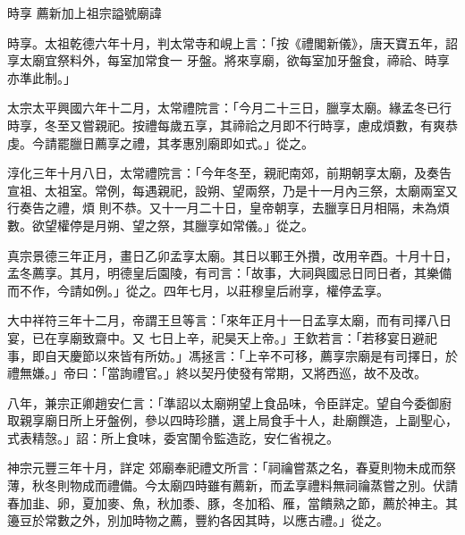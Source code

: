 
\begin{pinyinscope}

 時享
 薦新加上祖宗謚號廟諱



 時享。太祖乾德六年十月，判太常寺和峴上言：「按《禮閣新儀》，唐天寶五年，詔享太廟宜祭料外，每室加常食一
 牙盤。將來享廟，欲每室加牙盤食，禘祫、時享亦準此制。」



 太宗太平興國六年十二月，太常禮院言：「今月二十三日，臘享太廟。緣孟冬已行時享，冬至又嘗親祀。按禮每歲五享，其禘祫之月即不行時享，慮成煩數，有爽恭虔。今請罷臘日薦享之禮，其孝惠別廟即如式。」從之。



 淳化三年十月八日，太常禮院言：「今年冬至，親祀南郊，前期朝享太廟，及奏告宣祖、太祖室。常例，每遇親祀，設朔、望兩祭，乃是十一月內三祭，太廟兩室又行奏告之禮，煩
 則不恭。又十一月二十日，皇帝朝享，去臘享日月相隔，未為煩數。欲望權停是月朔、望之祭，其臘享如常儀。」從之。



 真宗景德三年正月，畫日乙卯孟享太廟。其日以鄆王外攢，改用辛酉。十月十日，孟冬薦享。其月，明德皇后園陵，有司言：「故事，大祠與國忌日同日者，其樂備而不作，今請如例。」從之。四年七月，以莊穆皇后祔享，權停孟享。



 大中祥符三年十二月，帝謂王旦等言：「來年正月十一日孟享太廟，而有司擇八日宴，已在享廟致齋中。又
 七日上辛，祀昊天上帝。」王欽若言：「若移宴日避祀事，即自天慶節以來皆有所妨。」馮拯言：「上辛不可移，薦享宗廟是有司擇日，於禮無嫌。」帝曰：「當詢禮官。」終以契丹使發有常期，又將西巡，故不及改。



 八年，兼宗正卿趙安仁言：「準詔以太廟朔望上食品味，令臣詳定。望自今委御廚取親享廟日所上牙盤例，參以四時珍膳，選上局食手十人，赴廟饌造，上副聖心，式表精愨。」詔：所上食味，委宮闈令監造訖，安仁省視之。



 神宗元豐三年十月，詳定
 郊廟奉祀禮文所言：「祠禴嘗蒸之名，春夏則物未成而祭薄，秋冬則物成而禮備。今太廟四時雖有薦新，而孟享禮料無祠禴蒸嘗之別。伏請春加韭、卵，夏加麥、魚，秋加黍、豚，冬加稻、雁，當饋熟之節，薦於神主。其籩豆於常數之外，別加時物之薦，豐約各因其時，以應古禮。」從之。




\end{pinyinscope}
